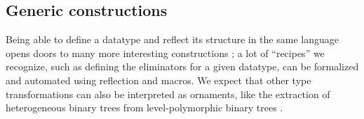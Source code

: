 \documentclass{article}
\theoremstyle{plain}%
\theoremstyle{definition}
\begin{document}
\subsection{Generic constructions}
Being able to define a datatype and reflect its structure in the same language opens doors to many more interesting constructions \cite{practgen}; a lot of ``recipes'' we recognize, such as defining the eliminators for a given datatype, can be formalized and automated using reflection and macros. We expect that other type transformations can also be interpreted as ornaments, like the extraction of heterogeneous binary trees from level-polymorphic binary trees \cite{hetbin}. 



% 



\printbibliography
\end{document}
